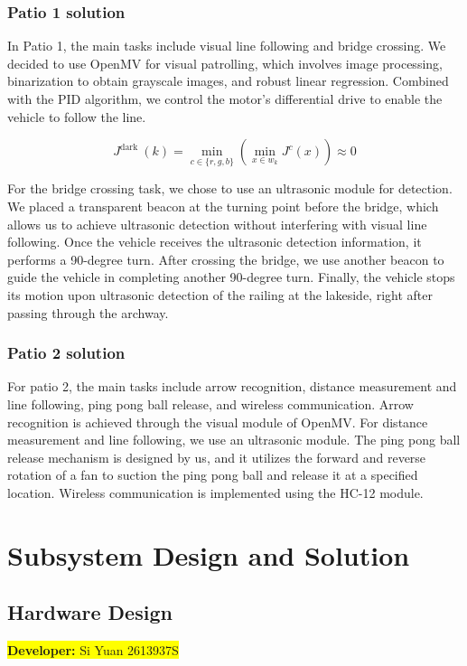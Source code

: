 \documentclass[12pt, a4paper, oneside]{report}
\begin{document}
\subsection{Patio 1 solution}
In Patio 1, the main tasks include visual line following and bridge crossing. We decided to use OpenMV for visual patrolling, which involves image processing, binarization to obtain grayscale images, and robust linear regression. Combined with the PID algorithm, we control the motor's differential drive to enable the vehicle to follow the line.

$$
J^{\text {dark }}(k)=\min _{c \in\{r, g, b\}}\left(\min _{x \in w_k} J^c(x)\right) \approx 0
$$

For the bridge crossing task, we chose to use an ultrasonic module for detection. We placed a transparent beacon at the turning point before the bridge, which allows us to achieve ultrasonic detection without interfering with visual line following. Once the vehicle receives the ultrasonic detection information, it performs a 90-degree turn. After crossing the bridge, we use another beacon to guide the vehicle in completing another 90-degree turn. Finally, the vehicle stops its motion upon ultrasonic detection of the railing at the lakeside, right after passing through the archway.

\subsection{Patio 2 solution}
For patio 2, the main tasks include arrow recognition, distance measurement and line following, ping pong ball release, and wireless communication. Arrow recognition is achieved through the visual module of OpenMV. For distance measurement and line following, we use an ultrasonic module. The ping pong ball release mechanism is designed by us, and it utilizes the forward and reverse rotation of a fan to suction the ping pong ball and release it at a specified location. Wireless communication is implemented using the HC-12 module.

\newpage
\chapter{Subsystem Design and Solution}
	
	
\section{Hardware Design}\label{sec:Hardware}
\colorbox{yellow}{\textbf{Developer:} Si Yuan 2613937S}
\end{document}
